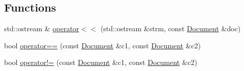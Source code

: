 \subsection*{Functions}
\begin{DoxyCompactItemize}
\item 
std\-::ostream \& \hyperlink{namespacedocs_a2464f4b0ad981aa2f4f4f56dd16afb18}{operator$<$$<$} (std\-::ostream \&strm, const \hyperlink{classdocs_1_1Document}{Document} \&doc)
\item 
bool \hyperlink{namespacedocs_a69ecd221cb71a7f629bf48b283aefbc2}{operator==} (const \hyperlink{classdocs_1_1Document}{Document} \&c1, const \hyperlink{classdocs_1_1Document}{Document} \&c2)
\item 
bool \hyperlink{namespacedocs_abbb9bd3baf3e28ceb50a275bb0695e89}{operator!=} (const \hyperlink{classdocs_1_1Document}{Document} \&c1, const \hyperlink{classdocs_1_1Document}{Document} \&c2)
\end{DoxyCompactItemize}
